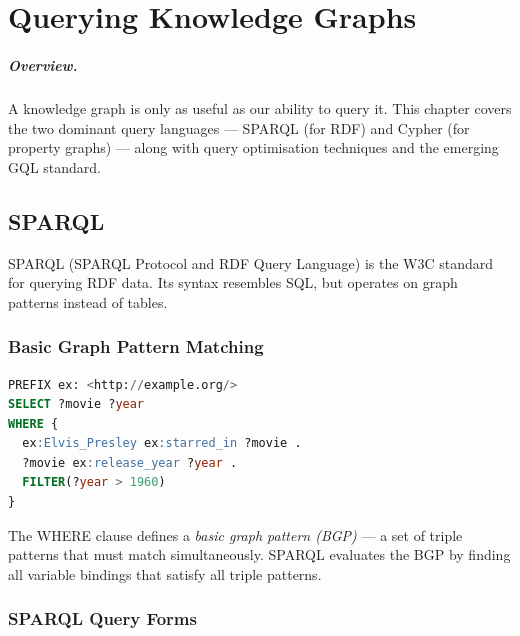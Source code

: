 \documentclass[11pt,a4paper,oneside,openany]{book}
\theoremstyle{definition}
\theoremstyle{plain}
\theoremstyle{remark}
\begin{document}
\chapter{Querying Knowledge Graphs}\label{ch:querying}

\paragraph{Overview.}
A knowledge graph is only as useful as our ability to query it. This chapter covers the two dominant query languages --- SPARQL (for RDF) and Cypher (for property graphs) --- along with query optimisation techniques and the emerging GQL standard.

\section{SPARQL}\label{sec:sparql}

SPARQL (SPARQL Protocol and RDF Query Language) is the W3C standard for querying RDF data. Its syntax resembles SQL, but operates on graph patterns instead of tables.

\subsection{Basic Graph Pattern Matching}

\begin{lstlisting}[language=SQL,numbers=none]
PREFIX ex: <http://example.org/>
SELECT ?movie ?year
WHERE {
  ex:Elvis_Presley ex:starred_in ?movie .
  ?movie ex:release_year ?year .
  FILTER(?year > 1960)
}
\end{lstlisting}

The WHERE clause defines a \emph{basic graph pattern (BGP)} --- a set of triple patterns that must match simultaneously. SPARQL evaluates the BGP by finding all variable bindings that satisfy all triple patterns.

\subsection{SPARQL Query Forms}
\end{document}
